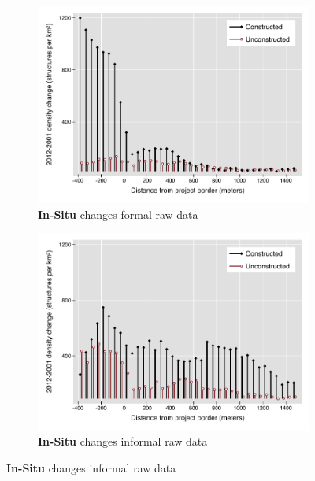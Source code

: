 \documentclass[12pt]{article}
\begin{document}
\begin{figure}
\begin{subfigure}[b]{0.48\textwidth}
        \end{subfigure}
        \begin{subfigure}[b]{0.48\textwidth}
                    \caption[Network2]%
            {{\footnotesize \textbf{In-Situ} changes formal raw data }}   
            \label{fig:prefor}
            \centering
            \includegraphics[width=\textwidth,trim={0.3cm .3cm 0.1cm 0cm}, clip=true]{figures/bblu_for_rawchanges_4_2_30k.pdf}

        \end{subfigure}
        \hfill
        \begin{subfigure}[b]{0.48\textwidth}  
                    \caption[]%
            {{\footnotesize \textbf{In-Situ} changes informal raw data }}     
            \label{fig:preinf}
            \centering 
            \includegraphics[width=\textwidth,trim={0.3cm .3cm 0.1cm 0cm}, clip=true]{figures/bblu_inf_rawchanges_4_2_30k.pdf}


\end{subfigure}
\end{figure}
\end{document}
